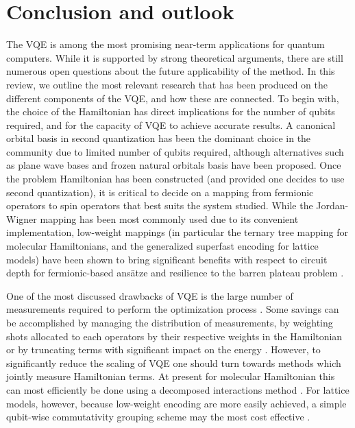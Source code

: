 \documentclass[a4paper,fleqn]{cas-sc}
\begin{document}
\section{Conclusion and outlook}

The VQE is among the most promising near-term applications for quantum computers. While it is supported by strong theoretical arguments, there are still numerous open questions about the future applicability of the method. In this review, we outline the most relevant research that has been produced on the different components of the VQE, and how these are connected. To begin with, the choice of the Hamiltonian has direct implications for the number of qubits required, and for the capacity of VQE to achieve accurate results. A canonical orbital basis in second quantization has been the dominant choice in the community due to limited number of qubits required, although alternatives such as plane wave bases \cite{Babbush2018, Barkoutsos2018} and frozen natural orbitals basis \cite{Gonthier2020} have been proposed. Once the problem Hamiltonian has been constructed (and provided one decides to use second quantization), it is critical to decide on a mapping from fermionic operators to spin operators that best suits the system studied. While the Jordan-Wigner mapping \cite{Jordan1928} has been most commonly used due to its convenient implementation, low-weight mappings (in particular the ternary tree mapping \cite{Jiang2020} for molecular Hamiltonians, and the generalized superfast encoding \cite{Setia2019} for lattice models) have been shown to bring significant benefits with respect to circuit depth \cite{Tranter2015} for fermionic-based ans\"atze and resilience to the barren plateau problem \cite{Cerezo2021_BP, Uvarov2020, Uvarov2020_frustrated}. 

One of the most discussed drawbacks of VQE is the large number of measurements required to perform the optimization process \cite{Wecker2015, Elfving2020, Gonthier2020}. Some savings can be accomplished by managing the distribution of measurements, by weighting shots allocated to each operators by their respective weights in the Hamiltonian \cite{Wecker2015, Rubin2018, Arrasmith2020} or by truncating terms with significant impact on the energy \cite{mccleanTheoryVariationalHybrid2015}. However, to significantly reduce the scaling of VQE one should turn towards methods which jointly measure Hamiltonian terms. At present for molecular Hamiltonian this can most efficiently be done using a decomposed interactions method \cite{Huggins2021, Yen2021_Cartan}. For lattice models, however, because low-weight encoding are more easily achieved, a simple qubit-wise commutativity grouping scheme may the most cost effective \cite{mccleanTheoryVariationalHybrid2015, Kandala2017, Hempel2018, Rubin2018, Kokail2019, Izmaylov2019, Nam2020, Verteletskyi2020, Hamamura2020, Gokhale2019_long}. 
\end{document}
